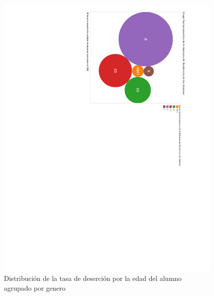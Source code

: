 \begin{figure}[H]
  \centering
    \includegraphics[page=2,angle=90,trim=0 0 100 0,scale=0.7]{Figuras/6SolucionPropuesta/eexploracion.pdf}
      \caption{Distribución de la tasa de deserción por la edad del alumno agrupado por genero}
    \label{fig:tdea}
\end{figure}